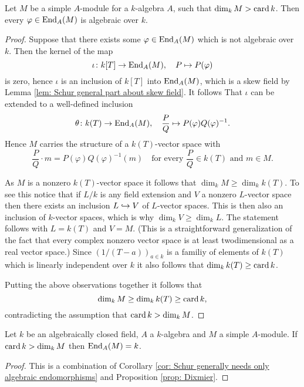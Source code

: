 \begin{proposition}[Dixmier]\label{prop: Dixmier}
 Let $M$ be a simple $A$-module for a $k$-algebra $A$, such that $\dim_k M > \operatorname{card} k$. Then every $\varphi \in \operatorname{End}_A(M)$ is algebraic over $k$.
\end{proposition}
\begin{proof}
 Suppose that there exists some $\varphi \in \operatorname{End}_A(M)$ which is not algebraic over $k$. Then the kernel of the map
 \[
  \iota \colon k[T] \to \operatorname{End}_A(M), \quad P \mapsto P(\varphi)
 \]
 is zero, hence $\iota$ is an inclusion of $k[T]$ into $\operatorname{End}_A(M)$, which is a skew field by Lemma \ref{lem: Schur general part about skew field}. It follows That $\iota$ can be extended to a well-defined inclusion
 \[
  \theta \colon k(T) \to \operatorname{End}_A(M), \quad \frac{P}{Q} \mapsto P(\varphi) Q(\varphi)^{-1}.
 \]
 Hence $M$ carries the structure of a $k(T)$-vector space with
 \[
  \frac{P}{Q} \cdot m = P(\varphi)Q(\varphi)^{-1}(m)
  \quad \text{for every $\frac{P}{Q} \in k(T)$ and $m \in M$}.
 \]
 
 As $M$ is a nonzero $k(T)$-vector space it follows that $\dim_k M \geq \dim_k k(T)$. To see this notice that if $L/k$ is any field extension and $V$ a nonzero $L$-vector space then there exists an inclusion $L \hookrightarrow V$ of $L$-vector spaces. This is then also an inclusion of $k$-vector spaces, which is why $\dim_k V \geq \dim_k L$. The statement follows with $L = k(T)$ and $V = M$. (This is a straightforward generalization of the fact that every complex nonzero vector space is at least twodimensional as a real vector space.) Since $(1/(T-a))_{a \in k}$ is a familiy of elements of $k(T)$ which is linearly independent over $k$ it also follows that $\dim_k k(T) \geq \operatorname{card} k$.

 Putting the above observations together it follows that
 \[
  \dim_k M \geq \dim_k k(T) \geq \operatorname{card} k,
 \]
 contradicting the assumption that $\operatorname{card} k > \dim_k M$.
\end{proof}


\begin{corollary}\label{cor: Dixmier algebraically closed}
 Let $k$ be an algebraically closed field, $A$ a $k$-algebra and $M$ a simple $A$-module. If $\operatorname{card} k > \dim_k M$ then $\operatorname{End}_A(M) = k$.
\end{corollary}
\begin{proof}
 This is a combination of Corollary \ref{cor: Schur generally needs only algebraic endomorphisms} and Proposition \ref{prop: Dixmier}.
\end{proof}


